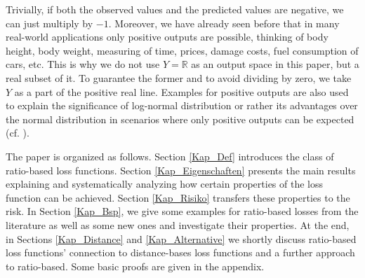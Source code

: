 \documentclass[10pt]{article}
\newcommand{\R}{\mathbb{R}}
\begin{document}
Trivially, if both the observed values and the predicted values are negative, we can just multiply by $-1$.
Moreover, we have already seen before that in many real-world applications only positive outputs are possible, thinking of body height, body weight, measuring of time, prices, damage costs, fuel consumption of cars, etc.
This is why we do not use $Y = \R$ as an output space in this paper, but a real subset of it.
To guarantee the former and to avoid dividing by zero, we take $Y$ as a part of the positive real line.
Examples for positive outputs are also used to explain the significance of log-normal distribution or rather its advantages over the normal distribution in scenarios where only positive outputs can be expected (cf. \cite{LimpertStahel2001, LimpertStahel2017}).\par
The paper is organized as follows. 
Section \ref{Kap_Def} introduces the class of ratio-based loss functions.
Section \ref{Kap_Eigenschaften} presents the main results explaining and systematically analyzing how certain properties of the loss function can be achieved. 
Section \ref{Kap_Risiko} transfers these properties to the risk.
In Section \ref{Kap_Bsp}, we give some examples for ratio-based losses from the literature as well as some new ones and investigate their properties. 
At the end, in Sections \ref{Kap_Distance} and \ref{Kap_Alternative} we shortly discuss ratio-based loss functions' connection to distance-bases loss functions and a further approach to ratio-based.
Some basic proofs are given in the appendix. 
\end{document}
